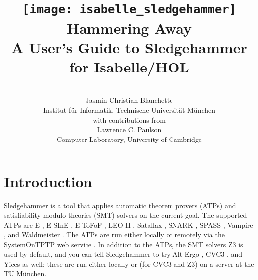 \documentclass[a4paper,12pt]{article}
\begin{document}
\renewcommand\labelitemi{\raise.065ex\hbox{\small\textbullet}}


\title{\texttt{[image: isabelle\_sledgehammer]} \\[4ex]
Hammering Away \\[\smallskipamount]
\Large A User's Guide to Sledgehammer for Isabelle/HOL}
\author{\hbox{} \\
Jasmin Christian Blanchette \\
{\normalsize Institut f\"ur Informatik, Technische Universit\"at M\"unchen} \\[4\smallskipamount]
{\normalsize with contributions from} \\[4\smallskipamount]
Lawrence C. Paulson \\
{\normalsize Computer Laboratory, University of Cambridge} \\
\hbox{}}

\maketitle

\tableofcontents

\setlength{\parskip}{.7em plus .2em minus .1em}
\setlength{\parindent}{0pt}
\setlength{\abovedisplayskip}{\parskip}
\setlength{\abovedisplayshortskip}{.9\parskip}
\setlength{\belowdisplayskip}{\parskip}
\setlength{\belowdisplayshortskip}{.9\parskip}

\newenvironment{enum}%
    {\begin{list}{}{%
        \setlength{\topsep}{.1\parskip}%
        \setlength{\partopsep}{.1\parskip}%
        \setlength{\itemsep}{\parskip}%
        \advance\itemsep by-\parsep}}
    {\end{list}}

\def\pre{\begingroup\vskip0pt plus1ex\advance\leftskip by\leftmargin
\advance\rightskip by\leftmargin}
\def\post{\vskip0pt plus1ex\endgroup}

\def\prew{\pre\advance\rightskip by-\leftmargin}
\def\postw{\post}

\section{Introduction}
\label{introduction}

Sledgehammer is a tool that applies automatic theorem provers (ATPs)
and satisfiability-modulo-theories (SMT) solvers on the current goal. The
supported ATPs are E \cite{schulz-2002}, E-SInE \cite{sine}, E-ToFoF
\cite{tofof}, LEO-II \cite{leo2}, Satallax \cite{satallax}, SNARK \cite{snark},
SPASS \cite{weidenbach-et-al-2009}, Vampire \cite{riazanov-voronkov-2002}, and
Waldmeister \cite{waldmeister}. The ATPs are run either locally or remotely via
the System\-On\-TPTP web service \cite{sutcliffe-2000}. In addition to the ATPs,
the SMT solvers Z3 \cite{z3} is used by default, and you can tell Sledgehammer
to try Alt-Ergo \cite{alt-ergo}, CVC3 \cite{cvc3}, and Yices \cite{yices} as
well; these are run either locally or (for CVC3 and Z3) on a server at the TU
M\"unchen.
\end{document}
